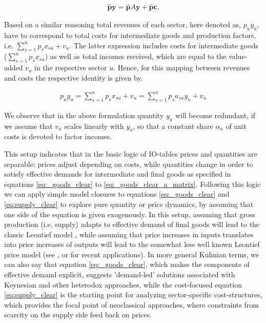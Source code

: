 \documentclass{article}
\newcommand{\hbf}[1]{\hat {\mathbf #1}}
\begin{document}
\begin{align}
  \label{eq:_goods_clear_a_matrix}
\hbf{p} \mathbf{y} = \hbf{p} A   \mathbf{y} + \hbf{p} \mathbf{c}.
\end{align}

Based on a similar reasoning total revenues of each sector, here denoted as, $p_u y_u$, have to correspond to total costs for intermediate goods and production factors, i.e. $\sum_{s=1}^n p_s x_{su} + v_u$. The latter expression includes costs for intermediate goods ($\sum_{s=1}^n p_s x_{su}$) as well as total incomes received, which are equal to the value-added $v_u$ in the respective sector $u$. Hence, for this mapping between revenues and costs the respective identity is given by.

\begin{align}
    \label{eq:supply_clear}
    p_u y_u = \sum_{s=1}^n p_s x_{su} + v_u = \sum_{s=1}^n p_s a_{su} y_u + v_u
\end{align}

We observe that in the above formulation quantity $y_u$ will become redundant, if we assume that $v_u$ scales linearly with $y_u$, so that a constant share $\alpha_u$ of unit costs is devoted to factor incomes.

This setup indicates that in the basic logic of IO-tables prices and quantities are separable: prices adjust depending on costs, while quantities change in order to satisfy effective demands for intermediate and final goods as specified in equations \eqref{eq:_goods_clear} to \eqref{eq:_goods_clear_a_matrix}. Following this logic we can apply simple model closures to equations \eqref{eq:_goods_clear} and \eqref{eq:supply_clear} to explore pure quantity or price dynamics, by assuming that one side of the equation is given exogenously. In this setup, assuming that gross production (i.e. supply) adapts to effective demand of final goods will lead to the classic Leontief model \citep[][see also section \ref{subsec:Leontief}]{leontief1986input}, while assuming that price increases in inputs translates into price increases of outputs will lead to the somewhat less well known Leontief price model (see \citealp{Weber.2023}, \citealp{Weber.2024} or \citealp{Nikiforos.2024} for recent applications). In more general Kuhnian terms, we can also say that equation \eqref{eq:_goods_clear}, which makes the components of effective demand explicit, suggests 'demand-led' solutions associated with Keynesian and other heterodox approaches, while the cost-focused equation \eqref{eq:supply_clear} is the starting point for analyzing sector-specific cost-structures, which provides the focal point of neoclassical approaches, where constraints from scarcity on the supply side feed back on prices.
\end{document}
